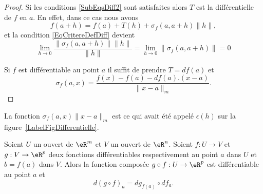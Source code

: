 \begin{proof}
	Si les conditions \eqref{SubEqsDiff2} sont satisfaites alors \( T\) est la différentielle de \( f\) en \( a\). En effet, dans ce cas nous avons
	\begin{equation}
		f(a+h)=f(a)+T(h)+\sigma_f(a,a+h)\| h \|,
	\end{equation}
	et la condition \eqref{EqCritereDefDiff} devient
	\begin{equation}
		\lim_{h\to 0} \frac{ \| \sigma_f(a,a+h) \|\| h \| }{ \| h \| }=\lim_{h\to 0} \| \sigma_f(a,a+h)\| =0
	\end{equation}


	Si \( f\) est différentiable au point \( a\) il suffit de prendre \( T=df(a)\) et
	\[
		\sigma_f(a,x)=\frac{f(x)-f(a)-df(a).(x-a)}{\|x-a\|_m}.
	\]
\end{proof}

\begin{remark}
	La fonction \( \sigma_f(a,x)\| x-a \|_m\) est ce qui avait été appelé \( \epsilon(h)\) sur la figure~\ref{LabelFigDifferentielle}.
\end{remark}

\begin{proposition}		\label{PropDiffCompose}
	Soient \( U\) un ouvert de \( \eR^m\) et \( V\) un ouvert de \( \eR^n\). Soient \( f: U\to V\)  et \( g: V \to \eR^p\) deux fonctions différentiables respectivement au point \( a\) dans \( U\) et \( b=f(a)\) dans \( V\). Alors la fonction composée \( g\circ f: U\to \eR^p \) est différentiable au point \( a\) et
	\begin{equation}	\label{EqDiffCompose}
		d(g\circ f)_a=dg_{f(a)}\circ df_a.
	\end{equation}
\end{proposition}

